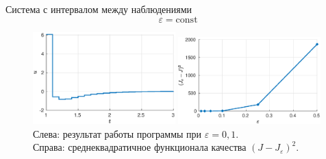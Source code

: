         \begin{frame}{Система с интервалом между наблюдениями}
                $$
                        \varepsilon = \mathrm{const}
                $$
                \begin{figure}[t]
                        \hfill
                        \includegraphics[width=0.49\textwidth]{content/reduction/01.eps}
                        \hfill
                        \includegraphics[width=0.49\textwidth]{content/reduction/square.eps}
                        \hfill
                        Слева: результат работы программы при $\varepsilon = 0,\!1$.\\
                        Справа: среднеквадратичное функционала качества $(J - J_{\varepsilon})^2$.
                \end{figure}
        \end{frame}
